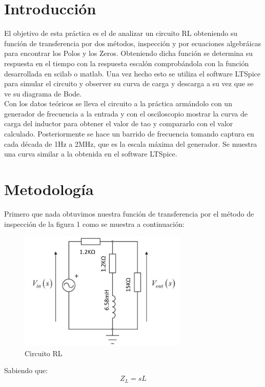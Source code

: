 \documentclass{report}
\newcounter{ns}
\begin{document}
\section{Introducción}

El objetivo de esta práctica es el de analizar un circuito RL obteniendo su función de transferencia por dos métodos, inspección y por ecuaciones algebráicas para encontrar los Polos y los Zeros. Obteniendo dicha función se determina su respuesta en el tiempo con la respuesta escalón comprobándola con la función desarrollada en scilab o matlab. Una vez hecho esto se utiliza el software LTSpice para simular el circuito y observer su curva de carga y descarga a su vez que se ve su diagrama de Bode.\\
Con los datos teóricos se lleva el circuito a la práctica armándolo con un generador de frecuencia a la entrada y con el osciloscopio mostrar la curva de carga del inductor para obtener el valor de tao y compararlo con el valor calculado. Posteriormente se hace un barrido de frecuencia tomando captura en cada década de 1Hz a 2MHz, que es la escala máxima del generador. Se muestra una curva similar a la obtenida en el software LTSpice.\\

\section{Metodología}

	Primero que nada obtuvimos nuestra función de transferencia por el método de inspección de la figura 1 como se muestra a continuación:
	
			\begin{figure}[H]
			\begin{center}
				\includegraphics[width=8cm]{6}
				\caption{Circuito RL}
			\end{center}
			\end{figure}
    Sabiendo que:\\
    \begin{equation*}
    Z_L = sL
    \end{equation*}
		
\end{document}
